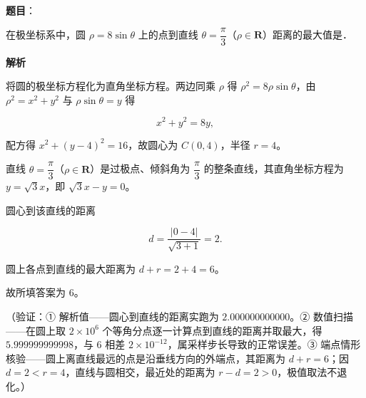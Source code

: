 \begin{answer}

\textbf{题目}：

在极坐标系中，圆 \(\rho=8\sin\theta\) 上的点到直线 \(\theta=\dfrac{\pi}{3}\)（\(\rho\in\mathbf{R}\)）距离的最大值是\gkblank{}．

\textbf{解析}

将圆的极坐标方程化为直角坐标方程。两边同乘 \(\rho\) 得 \(\rho^{2}=8\rho\sin\theta\)，由 \(\rho^{2}=x^{2}+y^{2}\) 与 \(\rho\sin\theta=y\) 得

\nopagebreak[4]
\[ x^{2}+y^{2}=8y, \]

配方得 \(x^{2}+(y-4)^{2}=16\)，故圆心为 \(C(0,4)\)，半径 \(r=4\)。

直线 \(\theta=\dfrac{\pi}{3}\)（\(\rho\in\mathbf{R}\)）是过极点、倾斜角为 \(\dfrac{\pi}{3}\) 的整条直线，其直角坐标方程为 \(y=\sqrt{3}x\)，即 \(\sqrt{3}x-y=0\)。

圆心到该直线的距离

\nopagebreak[4]
\[ d=\dfrac{|0-4|}{\sqrt{3+1}}=2 . \]

圆上各点到直线的最大距离为 \(d+r=2+4=6\)。

故所填答案为 \(6\)。

（验证：① 解析值——圆心到直线的距离实跑为 \(2.000000000000\)。② 数值扫描——在圆上取 \(2\times10^{6}\) 个等角分点逐一计算点到直线的距离并取最大，得 \(5.999999999998\)，与 \(6\) 相差 \(2\times10^{-12}\)，属采样步长导致的正常误差。③ 端点情形核验——圆上离直线最远的点是沿垂线方向的外端点，其距离为 \(d+r=6\)；因 \(d=2<r=4\)，直线与圆相交，最近处的距离为 \(r-d=2>0\)，极值取法不退化。）


\end{answer}
